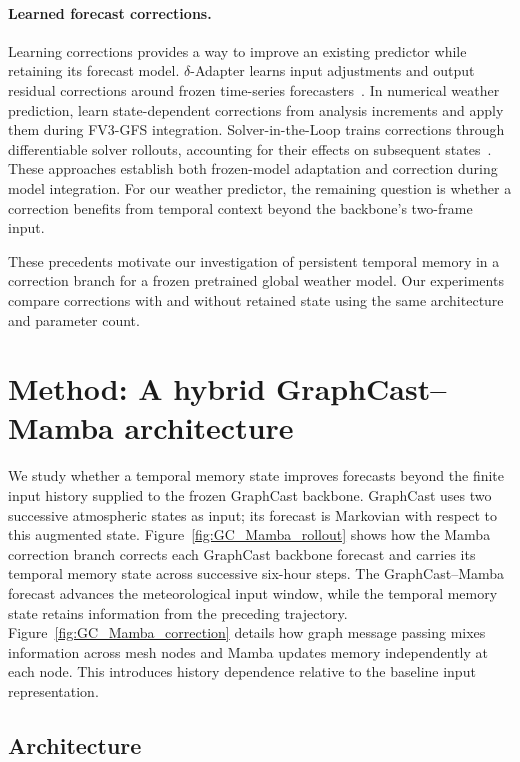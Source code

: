 \documentclass[11pt]{article}
\begin{document}
\paragraph{Learned forecast corrections.}
Learning corrections provides a way to improve an existing predictor while retaining its forecast model. $\delta$-Adapter learns input adjustments and output residual corrections around frozen time-series forecasters~\citep{liang2026forecast}. In numerical weather prediction, \citet{chen2022correcting} learn state-dependent corrections from analysis increments and apply them during FV3-GFS integration. Solver-in-the-Loop trains corrections through differentiable solver rollouts, accounting for their effects on subsequent states~\citep{um2020solver}. These approaches establish both frozen-model adaptation and correction during model integration. For our weather predictor, the remaining question is whether a correction benefits from temporal context beyond the backbone's two-frame input.

These precedents motivate our investigation of persistent temporal memory in a correction branch for a frozen pretrained global weather model. Our experiments compare corrections with and without retained state using the same architecture and parameter count.
\par
\endgroup


\section{Method: A hybrid GraphCast--Mamba architecture}


We study whether {a temporal memory state improves forecasts beyond the finite input history supplied to the frozen GraphCast backbone}. GraphCast uses two successive atmospheric states as input; its forecast is Markovian with respect to this augmented state. Figure~\ref{fig:GC_Mamba_rollout} shows {how the Mamba correction branch corrects each GraphCast backbone forecast and carries its temporal memory state across successive six-hour steps. The GraphCast--Mamba forecast advances the meteorological input window, while the temporal memory state retains information from the preceding trajectory.} Figure~\ref{fig:GC_Mamba_correction} details how graph message passing mixes information across mesh nodes and Mamba updates memory independently at each node. This introduces history dependence relative to the baseline input representation.

\subsection{{Architecture}}
\end{document}
